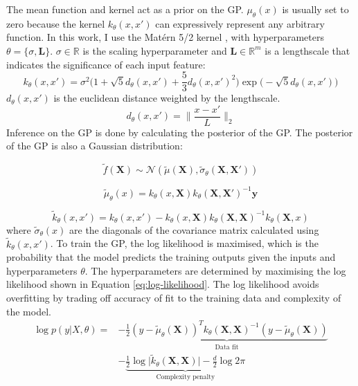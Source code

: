 The mean function and kernel act as a prior on the GP.  $\mu_{\theta}(x)$ is usually set to zero because the kernel  $k_{\theta}(x, x')$ can expressively represent any arbitrary function. In this work, I use the Matérn 5/2 kernel \cite{Rasmussen2006}, with hyperparameters $\theta=\{\sigma,\mathbf L \}$. $\sigma \in \mathbb R$ is the scaling hyperparameter and $\mathbf L \in \mathbb R^m$ is a lengthscale that indicates the significance of each input feature:
\begin{equation}
    k_{\theta}(x, x') = \sigma^2 \biggl(1 + \sqrt{5}d_{\theta}(x,x')+\frac{5}{3}d_{\theta}(x,x')^2\biggr)\exp\biggl(-\sqrt{5}d_{\theta}(x,x') \biggr)
\end{equation}
$d_{\theta}(x,x')$ is the euclidean distance weighted by the lengthscale.
\begin{equation}
    d_{\theta}(x,x')=\biggl\lVert \frac{x-x'}{L} \biggr\rVert_2
\end{equation}
Inference on the GP is done by calculating the posterior of the GP. The posterior of the GP is also a Gaussian distribution:

\begin{equation}
     \tilde f(\mathbf X) \sim \mathcal N(\tilde \mu(\mathbf X), \tilde \sigma_{\theta}(\mathbf X, \mathbf X'))
\end{equation}

\begin{equation}
    \tilde \mu_{\theta}(x) = k_{\theta}(x, \mathbf X)k_{\theta}(\mathbf X, \mathbf X')^{-1} \mathbf y
\end{equation}

\begin{equation}
    \tilde k_{\theta}(x,x') = k_{\theta}( x, x')-k_{\theta}(x, \mathbf X) k_{\theta}(\mathbf X, \mathbf X)^{-1}k_{\theta}(\mathbf X, x)
\end{equation}
where $\tilde \sigma_{\theta}(x)$ are the diagonals of the covariance matrix calculated using $\tilde k_{\theta}(x, x')$.
To train the GP, the log likelihood is maximised, which is the probability that the model predicts the training outputs given the inputs and hyperparameters $\theta$. The hyperparameters are determined by maximising the log likelihood  shown in Equation \ref{eq:log-likelihood}.  The log likelihood avoids overfitting by trading off accuracy of fit to the training data and complexity of the model.
\begin{equation}
\begin{split}
    \log p(y \vert X, \theta) = & -\underbrace{\frac{1}{2}(y-\tilde \mu_{\theta}(\mathbf X))^T k_{\theta}(\mathbf X, \mathbf X)^{-1}(y- \tilde\mu_{\theta}(\mathbf X)) }_{\text{Data  fit}} \\
    & - \underbrace{\frac{1}{2} \log{\vert \tilde k_{\theta}(\mathbf X, \mathbf X) \vert} - \frac{d}{2}\log{2 \pi}}_{\text{Complexity penalty}}
\end{split}
\label{eq:log-likelihood}
\end{equation}

